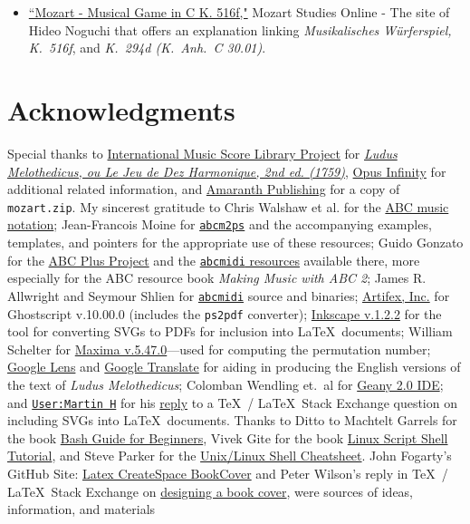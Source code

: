 \documentclass[a4paper,x11names,svgnames,10pt]{article}
\begin{document}
{\begin{itemize}
	\item \href{(http://www.asahi-net.or.jp/\~rb5h-ngc/e/k516f.htm}{``Mozart - Musical Game in C K. 516f,"}	Mozart Studies Online - The site of Hideo Noguchi that offers an explanation linking {\em Musikalisches W\"{u}rferspiel, K.\ 516f}, and  {\em K.\ 294d (K.\ Anh.\ C 30.01)}. 
\end{itemize}

\newpage
\section{Acknowledgments}
Special thanks to \href{https://imslp.org}{International Music Score Library Project} for \href{https://imslp.org/wiki/Ludus_Melothedicus_(Anonymous)}{\it Ludus Melothedicus, ou Le Jeu de Dez Harmonique, 2nd ed. (1759)}, \href{https://opus-infinity.org}{Opus Infinity} for additional related information, and \href{http://www.amaranthpublishing.com/MozartDiceGame.htm}{Amaranth Publishing} for a copy of {\tt mozart.zip}. My sincerest gratitude to Chris Walshaw et al. for the \href{http://www.abcnotation.com/}{ABC music notation}; Jean-Francois Moine for \href{http://moinejf.free.fr/}{\tt abcm2ps} and the accompanying examples, templates, and pointers for the appropriate use of these resources; Guido Gonzato for the \href{http://abcplus.sourceforge.net/}{ABC Plus Project} and the \href{http://abcplus.sourceforge.net/#abcMIDI}{{\tt abcmidi} resources} available there, more especially for the ABC resource book {\em Making Music with ABC 2}; James R. Allwright and Seymour Shlien for \href{http://abc.sourceforge.net/abcMIDI}{\tt abcmidi} source and binaries; \href{https://artifex.com/}{Artifex, Inc.} for Ghostscript v.10.00.0 (includes the {\tt ps2pdf} converter); \href{https://www.inkscape.org/}{Inkscape v.1.2.2} for the tool for converting SVGs to PDFs for inclusion into \LaTeX\ documents; William Schelter for \href{https://maxima.sourceforge.io}{Maxima v.5.47.0}---used for computing the permutation number; \href{https://google.lens}{Google Lens} and \href{https://translate.google.com}{Google Translate} for aiding in producing the English versions of the text of {\it Ludus Melothedicus}; Colomban Wendling et.\ al for \href{https://www.geany.org}{Geany 2.0 IDE}; and \href{https://tex.stackexchange.com/users/632/martin-h}{\tt User:Martin H} for his \href{https://tex.stackexchange.com/questions/2099/how-to-include-svg-diagrams-in-latex}{reply} to a \TeX\ / \LaTeX\ Stack Exchange question on including SVGs into \LaTeX\ documents. Thanks to  Ditto to Machtelt Garrels for the book \href{http://tldp.org/LDP/Bash-Beginners-Guide/html/Bash-Beginners-Guide.html}{Bash Guide for Beginners}, Vivek Gite for the book \href{http://www.freeos.com/guides/lsst/}{Linux Script Shell Tutorial}, and Steve Parker for the \href{http://steve-parker.org/sh/cheatsheet.pdf}{Unix/Linux Shell Cheatsheet}. John Fogarty's GitHub Site: \href{https://github.com/jfogarty/latex-createspace-bookcover}{Latex CreateSpace BookCover} and Peter Wilson's reply in  \TeX\ / \LaTeX\ Stack Exchange on \href{https://tex.stackexchange.com/questions/17579/how-can-i-design-a-book-cover}{designing a book cover}, were sources of ideas, information, and materials }
\end{document}
